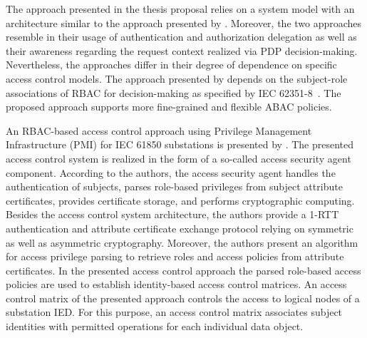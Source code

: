The approach presented in the thesis proposal relies on a system model with an architecture similar to the approach presented by \citeauthor{Alcaraz2016}.
Moreover, the two approaches resemble in their usage of authentication and authorization delegation as well as their awareness regarding the request context realized via PDP decision-making.
Nevertheless, the approaches differ in their degree of dependence on specific access control models.
The approach presented by \citeauthor{Alcaraz2016} depends on the subject-role associations of RBAC for decision-making as specified by IEC 62351-8~\cite{IEC62351P8}.
The proposed approach supports more fine-grained and flexible ABAC policies.

An RBAC-based access control approach using Privilege Management Infrastructure (PMI) for IEC 61850 substations is presented by \citeauthor{Liu2006} \cite{Liu2006}.
The presented access control system is realized in the form of a so-called access security agent component.
According to the authors, the access security agent handles the authentication of subjects, parses role-based privileges from subject attribute certificates, provides certificate storage, and performs cryptographic computing.
Besides the access control system architecture, the authors provide a 1-RTT authentication and attribute certificate exchange protocol relying on symmetric as well as asymmetric cryptography.
Moreover, the authors present an algorithm for access privilege parsing to retrieve roles and access policies from attribute certificates.
In the presented access control approach the parsed role-based access policies are used to establish identity-based access control matrices.
An access control matrix of the presented approach controls the access to logical nodes of a substation IED.
For this purpose, an access control matrix associates subject identities with permitted operations for each individual data object.

